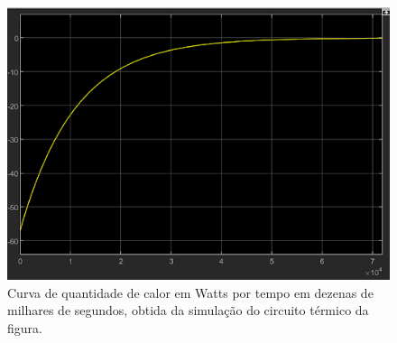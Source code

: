 \begin{figure}[H]
    \centering
    \includegraphics[scale=0.60]{figuras/projeto/controle/curva_q.png}
    \caption{Curva de quantidade de calor em Watts por tempo em dezenas de milhares de segundos, obtida da simulação do circuito térmico da figura.}
    \label{fig:curva_q}
\end{figure}




